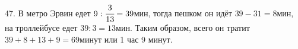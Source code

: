 47. В метро Эрвин едет $9:\cfrac{3}{13}=39$мин, тогда пешком он идёт $39-31=8$мин, на троллейбусе едет $39:3=13$мин. Таким образом, всего он тратит $39+8+13+9=69$минут или 1 час 9 минут.\\
